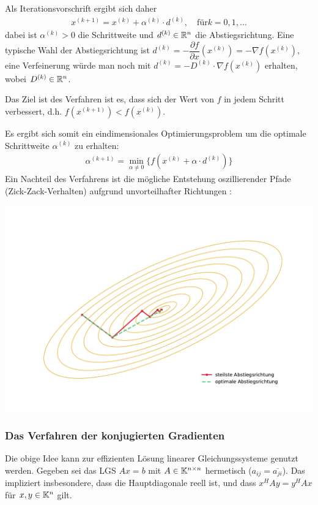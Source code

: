 Als Iterationsvorschrift ergibt sich daher 
%
\begin{align*}
  x^{(k+1)} 
  = x^{(k)}+\alpha^{(k)}\cdot d^{(k)}, 
  \quad \text{für} k=0,1,\dots
\end{align*}
%
dabei ist $\alpha^{(k)}>0$ die Schrittweite und $d^{(k)}\in\mathbb R^n$ die Abstiegsrichtung.
Eine typische Wahl der Abstiegsrichtung ist $d^{(k)}=-\dfrac{\partial f}{\partial x} (x^{(k)})=-\nabla f(x^{(k)})$, 
eine Verfeinerung würde man noch mit $d^{(k)}=-D^{(k)}\cdot\nabla f(x^{(k)})$ erhalten, wobei $D^{(k)}\in\mathbb R^n$.

Das Ziel ist des Verfahren ist es, dass sich der Wert von $f$ in jedem Schritt verbessert, 
d.h. $f(x^{(k+1)})<f(x^{(k)})$. 

Es ergibt sich somit ein eindimensionales Optimierungsproblem um die optimale Schrittweite $\alpha^{(k)}$ zu erhalten:
%
\begin{align*}
  \alpha^{(k+1)}
  =\min_{\alpha\neq 0}\{f(x^{(k)}+\alpha\cdot d^{(k)})\}
\end{align*}
%
Ein Nachteil des Verfahrens ist die mögliche Entstehung oszillierender Pfade (\glqq Zick-Zack-Verhalten\grqq{}) 
aufgrund unvorteilhafter Richtungen :
%
%  
%
\begin{center}
  \includegraphics[width=0.9\linewidth,trim=50 40 50 50,clip]{figures/zickZackCourse.pdf}
\end{center}

\subsubsection{Das Verfahren der konjugierten Gradienten}
Die obige Idee kann zur effizienten Lösung linearer Gleichungssysteme genutzt werden.
Gegeben sei das LGS $Ax=b$ mit $A\in\mathbb K^{n\times n}$ hermetisch
($a_{ij}=\overline{a_{ji}}$). Das impliziert insbesondere, dass die Hauptdiagonale reell ist, und dass $x^HAy = y^HAx$ 
für $x,y\in\mathbb K^n$ gilt.


